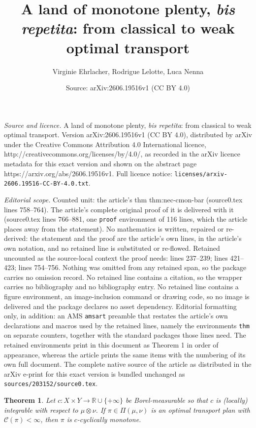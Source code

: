 \documentclass[10pt,a4paper]{amsart}
\title{A land of monotone plenty, \textit{bis repetita}: from classical to weak optimal transport}
\author{Virginie Ehrlacher, Rodrigue Lelotte, Luca Nenna}
\date{Source: arXiv:2606.19516v1 (CC BY 4.0)}
\newtheorem{thm}{Theorem}
\newcommand{\C}{\mathscr{C}}
\newcommand{\R}{\mathbb{R}}
\newcommand{\extendedR}{\R \cup \{+\infty\}}
\begin{document}
\maketitle

\noindent\emph{Source and licence.} A land of monotone plenty, \textit{bis repetita}: from classical to weak optimal transport. Version arXiv:2606.19516v1 (CC BY 4.0), distributed by arXiv under the Creative Commons Attribution 4.0 International licence, http://creativecommons.org/licenses/by/4.0/, as recorded in the arXiv licence metadata for this exact version and shown on the abstract page https://arxiv.org/abs/2606.19516v1. Full licence notice: \texttt{licenses/arxiv-2606.19516-CC-BY-4.0.txt}.\par\smallskip

\noindent\textit{Editorial scope.} Counted unit: the article's thm thm:nec-cmon-bar (source0.tex lines 758--764). The article's complete original proof of it is delivered with it (source0.tex lines 766--881, one \texttt{proof} environment of 116 lines, which the article places away from the statement). No mathematics is written, repaired or re-derived: the statement and the proof are the article's own lines, in the article's own notation, and no retained line is substituted or re-flowed.  Retained uncounted as the source-local context the proof needs: lines 237--239; lines 421--423; lines 754--756.  Nothing was omitted from any retained span, so the package carries no omission record.  No retained line contains a citation, so the wrapper carries no bibliography and no bibliography entry.  No retained line contains a figure environment, an image-inclusion command or drawing code, so no image is delivered and the package declares no asset dependency.  Editorial formatting only, in addition: an AMS \texttt{amsart} preamble that restates the article's own declarations and macros used by the retained lines, namely the environments \texttt{thm} on separate counters, together with the standard packages those lines need.  The retained environments print in this document as Theorem 1 in order of appearance, whereas the article prints the same items with the numbering of its own full document.  The complete native source of the article as distributed in the arXiv e-print for this exact version is bundled unchanged as \texttt{sources/203152/source0.tex}.
\begin{thm}\label{thm:best-thm-necessary}
	Let $c : X \times Y \to \extendedR$ be Borel-measurable so that $c$ is (locally) integrable with respect to $\mu \otimes \nu$. If $\pi \in \Pi(\mu, \nu)$ is an optimal transport plan with $\C(\pi) < \infty$, then $\pi$ is $c$-cyclically monotone.
\end{thm}
\end{document}
